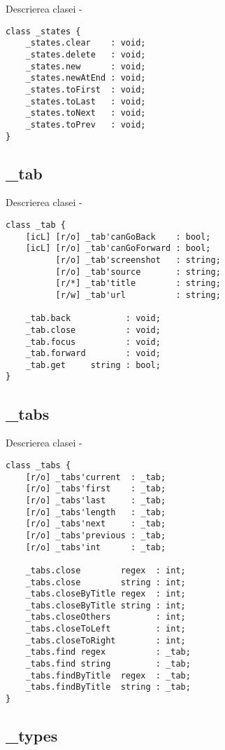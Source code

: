 \noindent Descrierea clasei  -
\begin{lstlisting}[numbers=none]
class _states {
	_states.clear    : void;
	_states.delete   : void;
	_states.new      : void;
	_states.newAtEnd : void;
	_states.toFirst  : void;
	_states.toLast   : void;
	_states.toNext   : void;
	_states.toPrev   : void;
}
\end{lstlisting}

\subsection{{\color{orange} \_tab}}

\noindent Descrierea clasei  -
\begin{lstlisting}[numbers=none]
class _tab {
	[icL] [r/o] _tab'canGoBack    : bool;
	[icL] [r/o] _tab'canGoForward : bool;
	      [r/o] _tab'screenshot   : string;
	      [r/o] _tab'source       : string;
	      [r/*] _tab'title        : string;
	      [r/w] _tab'url          : string;

	_tab.back           : void;
	_tab.close          : void;
	_tab.focus          : void;
	_tab.forward        : void;
	_tab.get     string : bool;
}
\end{lstlisting}

\subsection{{\color{orange} \_tabs}}

\noindent Descrierea clasei  -
\begin{lstlisting}[numbers=none]
class _tabs {
	[r/o] _tabs'current  : _tab;
	[r/o] _tabs'first    : _tab;
	[r/o] _tabs'last     : _tab;
	[r/o] _tabs'length   : _tab;
	[r/o] _tabs'next     : _tab;
	[r/o] _tabs'previous : _tab;
	[r/o] _tabs'int      : _tab;
	
	_tabs.close        regex  : int;
	_tabs.close        string : int;
	_tabs.closeByTitle regex  : int;
	_tabs.closeByTitle string : int;
	_tabs.closeOthers         : int;
	_tabs.closeToLeft         : int;
	_tabs.closeToRight        : int;
	_tabs.find regex          : _tab;
	_tabs.find string         : _tab;
	_tabs.findByTitle  regex  : _tab;
	_tabs.findByTitle  string : _tab;
}
\end{lstlisting}

\subsection{{\color{orange} \_types}}

